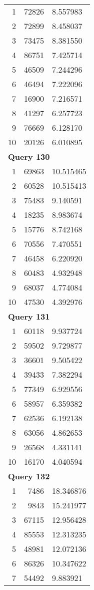 \begin{longtable}[{p}]{@{}rrp{}@{}}
1 & 72826 & 8.557983 \\
2 & 72899 & 8.458037 \\
3 & 73475 & 8.381550 \\
4 & 86751 & 7.425714 \\
5 & 46509 & 7.244296 \\
6 & 46494 & 7.222096 \\
7 & 16900 & 7.216571 \\
8 & 41297 & 6.257723 \\
9 & 76669 & 6.128170 \\
10 & 20126 & 6.010895 \\
\midrule
\multicolumn{3}{l}{\bfseries Query 130} \\
1 & 69863 & 10.515465 \\
2 & 60528 & 10.515413 \\
3 & 75483 & 9.140591 \\
4 & 18235 & 8.983674 \\
5 & 15776 & 8.742168 \\
6 & 70556 & 7.470551 \\
7 & 46458 & 6.220920 \\
8 & 60483 & 4.932948 \\
9 & 68037 & 4.774084 \\
10 & 47530 & 4.392976 \\
\midrule
\multicolumn{3}{l}{\bfseries Query 131} \\
1 & 60118 & 9.937724 \\
2 & 59502 & 9.729877 \\
3 & 36601 & 9.505422 \\
4 & 39433 & 7.382294 \\
5 & 77349 & 6.929556 \\
6 & 58957 & 6.359382 \\
7 & 62536 & 6.192138 \\
8 & 63056 & 4.862653 \\
9 & 26568 & 4.331141 \\
10 & 16170 & 4.040594 \\
\midrule
\multicolumn{3}{l}{\bfseries Query 132} \\
1 & 7486 & 18.346876 \\
2 & 9843 & 15.241977 \\
3 & 67115 & 12.956428 \\
4 & 85553 & 12.313235 \\
5 & 48981 & 12.072136 \\
6 & 86326 & 10.347622 \\
7 & 54492 & 9.883921 \\

\end{longtable}
